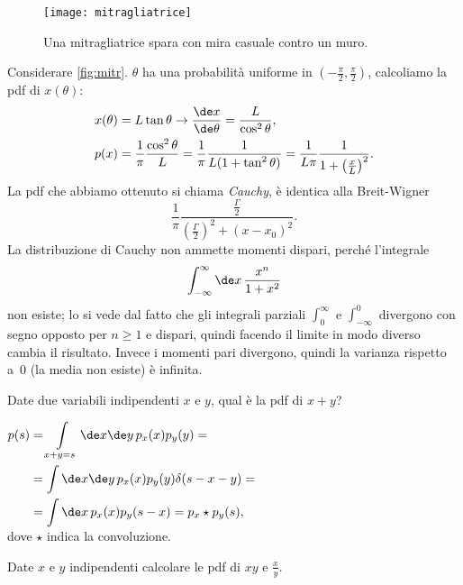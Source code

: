 \begin{figure}
	\centering
	\texttt{[image: mitragliatrice]}
	\caption{\label{fig:mitr} Una mitragliatrice spara con mira casuale contro un muro.}
\end{figure}
Considerare \autoref{fig:mitr}. $\theta$ ha una probabilità uniforme in $\left(-\frac\pi2,\frac\pi2\right)$, calcoliamo la pdf di $x(\theta)$:
\begin{align*}
	x(\theta) &= L \tan\theta \rightarrow \frac{\de x}{\de\theta} = \frac L {\cos^2\theta}, \\
	p(x) &= \frac1\pi \frac{\cos^2\theta} L = \frac1\pi\frac1{L(1+\tan^2\theta)} = \frac1{L\pi}\frac1{1+\left(\frac xL\right)^2}.
\end{align*}
La pdf che abbiamo ottenuto si chiama \emph{Cauchy}, è identica alla Breit-Wigner
\begin{equation*}
	\frac1\pi \frac {\frac\Gamma2} {\left(\frac\Gamma2\right)^2 + (x-x_0)^2}.
\end{equation*}
La distribuzione di Cauchy non ammette momenti dispari, perché l'integrale
\begin{equation*}
	\int_{-\infty}^\infty \de x\,\frac {x^n} {1+x^2}
\end{equation*}
non esiste; lo si vede dal fatto che gli integrali parziali $\int_{0}^\infty$ e $\int_{-\infty}^{0}$ divergono con segno opposto per $n \ge 1$ e dispari, quindi facendo il limite in modo diverso cambia il risultato.
Invece i momenti pari divergono, quindi la varianza rispetto a~0 (la media non esiste) è infinita.

\begin{ex}
	Date due variabili indipendenti $x$ e $y$, qual è la pdf di $x+y$?
\end{ex}

\begin{solution*}
	$\begin{aligned}[t]
		p(s) &= \int\limits_{x+y = s} \de x\de y\, p_x(x) p_y(y) = \\
		&= \int \de x\de y\, p_x(x) p_y(y) \delta(s - x - y) = \\
		&= \int \de x\, p_x(x) p_y(s-x) = p_x \star p_y (s),
	\end{aligned}$\vspace{.5em}\\
	dove $\star$ indica la convoluzione.
\end{solution*}

\begin{ex}
	Date $x$ e $y$ indipendenti calcolare le pdf di $xy$ e $\frac xy$.
\end{ex}

